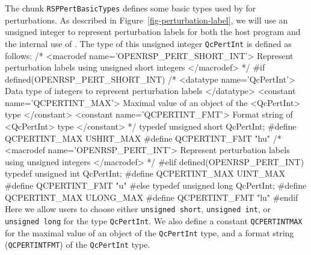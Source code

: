 The chunk {\tt{}RSPPertBasicTypes} defines some basic types used by \LibName for
perturbations. As described in Figure~\ref{fig-perturbation-label}, we will use
an unsigned integer to represent perturbation labels for both the host program
and the internal use of \LibName. The type of this unsigned integer
{\tt{}QcPertInt} is defined as follows:
\nwenddocs{}\endmoddef
/* <macrodef name='OPENRSP_PERT_SHORT_INT'>
     Represent perturbation labels using unsigned short integers
   </macrodef> */
#if defined(OPENRSP_PERT_SHORT_INT)
/* <datatype name='QcPertInt'>
     Data type of integers to represent perturbation labels
   </datatype>
   <constant name='QCPERTINT_MAX'>
     Maximal value of an object of the <QcPertInt> type
   </constant>
   <constant name='QCPERTINT_FMT'>
     Format string of <QcPertInt> type
   </constant> */
typedef unsigned short QcPertInt;
#define QCPERTINT_MAX USHRT_MAX
#define QCPERTINT_FMT "hu"
/* <macrodef name='OPENRSP_PERT_INT'>
     Represent perturbation labels using unsigned integers
   </macrodef> */
#elif defined(OPENRSP_PERT_INT)
typedef unsigned int QcPertInt;
#define QCPERTINT_MAX UINT_MAX
#define QCPERTINT_FMT "u"
#else
typedef unsigned long QcPertInt;
#define QCPERTINT_MAX ULONG_MAX
#define QCPERTINT_FMT "lu"
#endif
\nwendcode{}Here we allow users to choose either
{\tt{}unsigned\ short},
{\tt{}unsigned\ int}, or {\tt{}unsigned\ long} for the
type {\tt{}QcPertInt}. We also define a constant
{\tt{}QCPERTINT{}MAX} for the maximal value of an object
of the {\tt{}QcPertInt} type, and a format string
({\tt{}QCPERTINT{}FMT}) of the {\tt{}QcPertInt} type.

